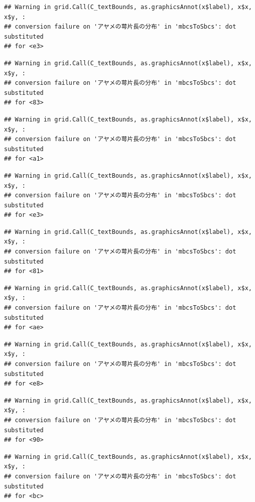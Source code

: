 \documentclass[
]{book}
\begin{document}
\begin{verbatim}
## Warning in grid.Call(C_textBounds, as.graphicsAnnot(x$label), x$x, x$y, :
## conversion failure on 'アヤメの萼片長の分布' in 'mbcsToSbcs': dot substituted
## for <e3>
\end{verbatim}

\begin{verbatim}
## Warning in grid.Call(C_textBounds, as.graphicsAnnot(x$label), x$x, x$y, :
## conversion failure on 'アヤメの萼片長の分布' in 'mbcsToSbcs': dot substituted
## for <83>
\end{verbatim}

\begin{verbatim}
## Warning in grid.Call(C_textBounds, as.graphicsAnnot(x$label), x$x, x$y, :
## conversion failure on 'アヤメの萼片長の分布' in 'mbcsToSbcs': dot substituted
## for <a1>
\end{verbatim}

\begin{verbatim}
## Warning in grid.Call(C_textBounds, as.graphicsAnnot(x$label), x$x, x$y, :
## conversion failure on 'アヤメの萼片長の分布' in 'mbcsToSbcs': dot substituted
## for <e3>
\end{verbatim}

\begin{verbatim}
## Warning in grid.Call(C_textBounds, as.graphicsAnnot(x$label), x$x, x$y, :
## conversion failure on 'アヤメの萼片長の分布' in 'mbcsToSbcs': dot substituted
## for <81>
\end{verbatim}

\begin{verbatim}
## Warning in grid.Call(C_textBounds, as.graphicsAnnot(x$label), x$x, x$y, :
## conversion failure on 'アヤメの萼片長の分布' in 'mbcsToSbcs': dot substituted
## for <ae>
\end{verbatim}

\begin{verbatim}
## Warning in grid.Call(C_textBounds, as.graphicsAnnot(x$label), x$x, x$y, :
## conversion failure on 'アヤメの萼片長の分布' in 'mbcsToSbcs': dot substituted
## for <e8>
\end{verbatim}

\begin{verbatim}
## Warning in grid.Call(C_textBounds, as.graphicsAnnot(x$label), x$x, x$y, :
## conversion failure on 'アヤメの萼片長の分布' in 'mbcsToSbcs': dot substituted
## for <90>
\end{verbatim}

\begin{verbatim}
## Warning in grid.Call(C_textBounds, as.graphicsAnnot(x$label), x$x, x$y, :
## conversion failure on 'アヤメの萼片長の分布' in 'mbcsToSbcs': dot substituted
## for <bc>
\end{verbatim}
\end{document}
